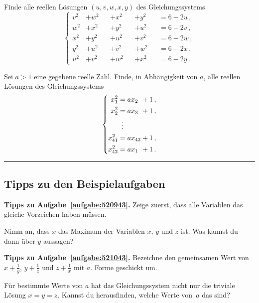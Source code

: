 \begin{aufgabe*}\label{aufgabe:Sayda2013}
	Finde alle reellen Lösungen $(u,v,w,x,y)$ des Gleichungssystems
	\begin{equation*}
		\left\{\begin{alignedat}{4}
			v^2&+w^2&&+x^2&&+y^2 &&= 6-2u\,,\\
			w^2&+x^2&&+y^2&&+u^2 &&= 6-2v\,,\\
			x^2&+y^2&&+u^2&&+v^2 &&= 6-2w\,,\\
			y^2&+u^2&&+v^2&&+w^2 &&= 6-2x\,,\\
			u^2&+v^2&&+w^2&&+x^2 &&= 6-2y\,.
		\end{alignedat}\right.
	\end{equation*}
\end{aufgabe*}
\begin{aufgabe*}[*]\label{aufgabe:IMOSL1993VNM}
	Sei $a>1$ eine gegebene reelle Zahl. Finde, in Abhängigkeit von $a$, alle reellen Lösungen des Gleichungssystems
	\begin{equation*}
		\left\{\begin{alignedat}{2}
			x_1^2 &= ax_2&&+1\,,\\
			x_2^2 &= ax_3&&+1\,,\\
			&\mathrel{\tikz[inner sep=0,outer sep=0]{\node at (0,-0.5ex) {$\phantom{=}$};\node at (0,0) {$\vdots$};}}\\
			x_{41}^2 &= ax_{42}&&+1\,,\\
			x_{42}^2 &= ax_1&&+1\,.
		\end{alignedat}\right.
	\end{equation*}
\end{aufgabe*}
\vfill\hrule\vspace{-1em}

\subsection*{Tipps zu den Beispielaufgaben}
\textbf{Tipps zu Aufgabe~\ref{aufgabe:520943}.} Zeige zuerst, dass alle Variablen das gleiche Vorzeichen haben müssen.

Nimm an, dass $x$ das Maximum der Variablen $x$, $y$ und $z$ ist. Was kannst du dann über $y$ aussagen?

\textbf{Tipps zu Aufgabe~\ref{aufgabe:521043}.} Bezeichne den gemeinsamen Wert von $x+\frac 1y$, $y+\frac 1z$ und $z+\frac 1x$ mit $a$. Forme geschickt um.

Für bestimmte Werte von $a$ hat das Gleichungssystem nicht nur die triviale Lösung $x=y=z$. Kannst du herausfinden, welche Werte von~$a$ das sind?

